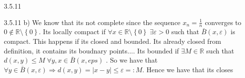 \documentclass[a4paper,norsk]{article}
\renewcommand{\leq}{\leqslant}
\renewcommand{\epsilon}{\varepsilon}
\begin{document}
\begin{oppgavebox}{3.5.11}{}
\begin{itemize}
  \begin{proofbox}{3.5.11 b)}{}
    We know that its not complete since the sequence $ x_n = \frac{ 1 }{ n } $ converges to $ 0 \notin \mathbb{R} \setminus \left\{ 0 \right\}  $. Its locally compact if $ \forall x \in \mathbb{R} \setminus \left\{ 0 \right\}  \; \exists \epsilon  > 0 $ such that $ \bar{B} \left( x, \epsilon  \right)  $ is compact. This happens if its closed and bounded. Its already closed from definition, it contains its boudnary points.... Its bounded if $ \exists M \in \mathbb{R} $ such that $ d \left( x,y \right) \leq M \; \forall y, x \in \bar{B} \left( x, eps \right) $  . So we have that $ \forall y \in \bar{B} \left( x, \epsilon  \right) \Rightarrow d \left( x, y \right) = \left| x-y \right| \leq \epsilon =: M$. Hence we have that its closes
  \end{proofbox}
\end{itemize}
\end{oppgavebox}
\end{document}

